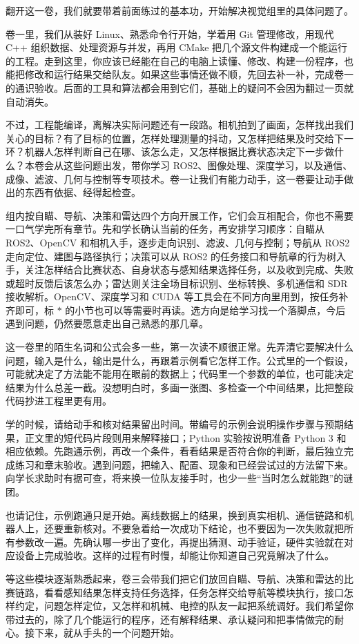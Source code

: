 翻开这一卷，我们就要带着前面练过的基本功，开始解决视觉组里的具体问题了。

卷一里，我们从装好 Linux、熟悉命令行开始，学着用 Git 管理修改，用现代 C++ 组织数据、处理资源与并发，再用 CMake 把几个源文件构建成一个能运行的工程。走到这里，你应该已经能在自己的电脑上读懂、修改、构建一份程序，也能把修改和运行结果交给队友。如果这些事情还做不顺，先回去补一补，完成卷一的通识验收。后面的工具和算法都会用到它们，基础上的疑问不会因为翻过一页就自动消失。

不过，工程能编译，离解决实际问题还有一段路。相机拍到了画面，怎样找出我们关心的目标？有了目标的位置，怎样处理测量的抖动，又怎样把结果及时交给下一环？机器人怎样判断自己在哪、该怎么走，又怎样根据比赛状态决定下一步做什么？本卷会从这些问题出发，带你学习 ROS2、图像处理、深度学习，以及通信、成像、滤波、几何与控制等专项技术。卷一让我们有能力动手，这一卷要让动手做出的东西有依据、经得起检查。

组内按自瞄、导航、决策和雷达四个方向开展工作，它们会互相配合，你也不需要一口气学完所有章节。先和学长确认当前的任务，再安排学习顺序：自瞄从 ROS2、OpenCV 和相机入手，逐步走向识别、滤波、几何与控制；导航从 ROS2 走向定位、建图与路径执行；决策可以从 ROS2 的任务接口和导航章的行为树入手，关注怎样结合比赛状态、自身状态与感知结果选择任务，以及收到完成、失败或超时反馈后该怎么办；雷达则关注全场目标识别、坐标转换、多机通信和 SDR 接收解析。OpenCV、深度学习和 CUDA 等工具会在不同方向里用到，按任务补齐即可，标 $*$ 的小节也可以等需要时再读。选方向是给学习找一个落脚点，今后遇到问题，仍然要愿意走出自己熟悉的那几章。

这一卷里的陌生名词和公式会多一些，第一次读不顺很正常。先弄清它要解决什么问题，输入是什么，输出是什么，再跟着示例看它怎样工作。公式里的一个假设，可能就决定了方法能不能用在眼前的数据上；代码里一个参数的单位，也可能决定结果为什么总差一截。没想明白时，多画一张图、多检查一个中间结果，比把整段代码抄进工程里更有用。

学的时候，请给动手和核对结果留出时间。带编号的示例会说明操作步骤与预期结果，正文里的短代码片段则用来解释接口；Python 实验按说明准备 Python 3 和相应依赖。先跑通示例，再改一个条件，看看结果是否符合你的判断，最后独立完成练习和章末验收。遇到问题，把输入、配置、现象和已经尝试过的方法留下来。向学长求助时有据可查，将来换一位队友接手时，也少一些“当时怎么就能跑”的谜团。

也请记住，示例跑通只是开始。离线数据上的结果，换到真实相机、通信链路和机器人上，还要重新核对。不要急着给一次成功下结论，也不要因为一次失败就把所有参数改一遍。先确认哪一步出了变化，再提出猜测、动手验证，硬件实验就在对应设备上完成验收。这样的过程有时慢，却能让你知道自己究竟解决了什么。

等这些模块逐渐熟悉起来，卷三会带我们把它们放回自瞄、导航、决策和雷达的比赛链路，看看感知结果怎样支持任务选择，任务怎样交给导航等模块执行，接口怎样约定，问题怎样定位，又怎样和机械、电控的队友一起把系统调好。我们希望你带过去的，除了几个能运行的程序，还有解释结果、承认疑问和把事情做完的耐心。接下来，就从手头的一个问题开始。
